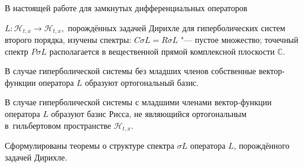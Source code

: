 {В настоящей работе для замкнутых дифференциальных операторов

$L:\mathcal{H}_{t,x}\to\mathcal{H}_{t,x},$ порождённых задачей Дирихле для гиперболических систем второго порядка, изучены спектры: $C\sigma{L}=R\sigma{L}$ "--- пустое множество; точечный спектр $P\sigma{L}$ располагается в вещественной прямой комплексной плоскости $\mathbb{C}$.

В случае гиперболической системы без младших членов собственные  вектор-функции оператора $L$ образуют ортогональный базис.

В случае гиперболической системы с младшими членами вектор-функции оператора $L$ образуют базис Рисса, не являющийся ортогональным в~гильбертовом пространстве $\mathcal{H}_{t,x}.$

Сформулированы  теоремы о структуре спектра $\sigma L$ оператора $L$, порождённого задачей Дирихле.

}







%





%


